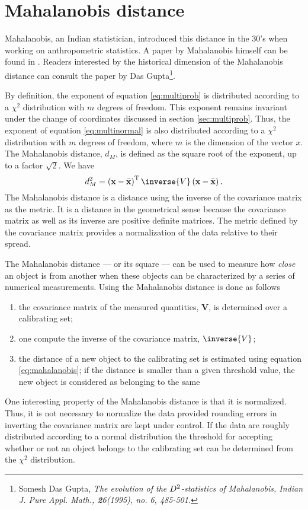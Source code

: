 {\section{Mahalanobis distance}
\label{sec:mahalanobis} Mahalanobis, an Indian statistician,
introduced this distance in the 30's when working on
anthropometric statistics. A paper by Mahalanobis himself can be
found in \cite{AtchBry}. Readers interested by the historical
dimension of the Mahalanobis distance can consult the paper by Das
Gupta\footnote{Somesh Das Gupta, \em{The evolution of the $D\sp
2$-statistics of Mahalanobis}, Indian J. Pure Appl. Math., {\textbf
26}(1995), no. 6, 485-501.}.

By definition, the exponent of equation \ref{eq:multiprob} is
distributed according to a $\chi^2$ distribution with $m$ degrees
of freedom. This exponent remains invariant under the change of
coordinates discussed in section \ref{sec:multiprob}. Thus, the
exponent of equation \ref{eq:multinormal} is also distributed
according to a $\chi^2$ distribution with $m$ degrees of freedom,
where $m$ is the dimension of the vector $x$. The Mahalanobis
distance, $d_M$, is defined as the square root of the exponent, up
to a factor $\sqrt{2}$. We have
\begin{equation}
\label{eq:mahalanobis} d^2_M = \left({\textbf x}-\bar{{\textbf
x}}\right)^{\mathop{\textrm T}} \inverse{V}\left({\textbf x}-\bar{{\textbf
x}}\right).
\end{equation}
The Mahalanobis distance is a distance using the inverse of the
covariance matrix as the metric. It is a distance in the
geometrical sense because the covariance matrix as well as its
inverse are positive definite matrices. The metric defined by the
covariance matrix provides a normalization of the data relative to
their spread.

The Mahalanobis distance --- or its square --- can be used to
measure how \textsl{close} an object is from another when these
objects can be characterized by a series of numerical
measurements. Using the Mahalanobis distance is done as follows
\begin{enumerate}
  \item the covariance matrix of the measured quantities, $\textbf{V}$, is
determined over a calibrating set;
  \item one compute the inverse of the covariance matrix,
  $\inverse{V}$;
  \item the distance of a new object to the calibrating set is
  estimated using equation \ref{eq:mahalanobis}; if the distance
  is smaller than a given threshold value, the new object is
  considered as belonging to the same
\end{enumerate}
One interesting property of the Mahalanobis distance is that it is
normalized. Thus, it is not necessary to normalize the data
provided rounding errors in inverting the covariance matrix are
kept under control. If the data are roughly distributed according
to a normal distribution the threshold for accepting whether or
not an object belongs to the calibrating set can be determined
from the $\chi^2$ distribution.

}
